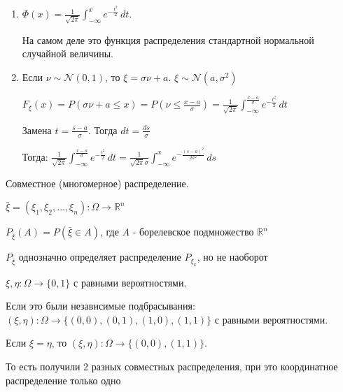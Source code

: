 \begin{example}
    \begin{remark}
        \begin{enumerate}
            \item {
                $\Phi (x) = \frac{1}{\sqrt{2 \pi}} \int_{-\infty}^{x} e^{-\frac{t^2}{2}} \, dt$.

                На самом деле это функция распределения стандартной нормальной случайной величины.
            }
            \item {
                Если $\nu \sim \mathcal{N}(0, 1)$, то $\xi = \sigma \nu + a$. $\xi \sim \mathcal{N}(a, \sigma^2)$

                $F_{\xi} (x) = P(\sigma \nu + a \leqslant x) = P(\nu \leqslant \frac{x - a}{\sigma}) = \frac{1}{\sqrt{2 \pi}}
                \int_{-\infty}^{\frac{x - a}{\sigma}} e^{-\frac{t^2}{2}} \, dt$

                Замена $t = \frac{s - a}{\sigma}$. Тогда $dt = \frac{ds}{\sigma}$

                Тогда: $\frac{1}{\sqrt{2 \pi}}
                \int_{-\infty}^{\frac{x - a}{\sigma}} e^{-\frac{t^2}{2}} \, dt = \frac{1}{\sqrt{2\pi} \sigma}
                \int_{-\infty}^{x} e^{-\frac{(s - a)^2}{2\sigma^2}} \, ds$
            }
        \end{enumerate}

    \end{remark}
\end{example}


\begin{definition}
    Совместное (многомерное) распределение.

    $\bar{\xi} = (\xi_1, \xi_2, \ldots, \xi_n) : \Omega \to \mathbb{R}^n$

    $P_{\bar{\xi}} (A) = P(\bar{\xi} \in A)$, где $A$ - борелевское подмножество $\mathbb{R}^n$

    \begin{remark}
        $P_{\bar{\xi}}$ однозначно определяет распределение $P_{\xi_k}$, но не наоборот

        \begin{example}
            $\xi, \eta : \Omega \to \{ 0, 1 \}$  с равными вероятностями.

            Если это были независимые подбрасывания: $(\xi, \eta) : \Omega \to
            \{ (0, 0), (0, 1), (1, 0), (1, 1) \}$  с равными вероятностями.

            Если $\xi = \eta$, то $(\xi, \eta) : \Omega \to \{ (0, 0), (1, 1) \}$.

            То есть получили 2 разных совместных распределения, при это координатное распределение только одно

        \end{example}
    \end{remark}
\end{definition}

